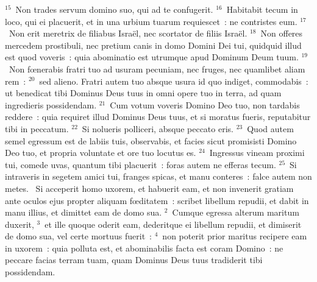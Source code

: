 ${}^{15}$~Non trades servum domino suo, qui ad te confugerit.
${}^{16}$~Habitabit tecum in loco, qui ei placuerit, et in una urbium tuarum requiescet~: ne contristes eum.
${}^{17}$~Non erit meretrix de filiabus Isra\"el, nec scortator de filiis Isra\"el.
${}^{18}$~Non offeres mercedem prostibuli, nec pretium canis in domo Domini Dei tui, quidquid illud est quod voveris~: quia abominatio est utrumque apud Dominum Deum tuum.
${}^{19}$~Non fœnerabis fratri tuo ad usuram pecuniam, nec fruges, nec quamlibet aliam rem~:
${}^{20}$~sed alieno. Fratri autem tuo absque usura id quo indiget, commodabis~: ut benedicat tibi Dominus Deus tuus in omni opere tuo in terra, ad quam ingredieris possidendam.
${}^{21}$~Cum votum voveris Domino Deo tuo, non tardabis reddere~: quia requiret illud Dominus Deus tuus, et si moratus fueris, reputabitur tibi in peccatum.
${}^{22}$~Si nolueris polliceri, absque peccato eris.
${}^{23}$~Quod autem semel egressum est de labiis tuis, observabis, et facies sicut promisisti Domino Deo tuo, et propria voluntate et ore tuo locutus es.
${}^{24}$~Ingressus vineam proximi tui, comede uvas, quantum tibi placuerit~: foras autem ne efferas tecum.
${}^{25}$~Si intraveris in segetem amici tui, franges spicas, et manu conteres~: falce autem non metes.
~Si acceperit homo uxorem, et habuerit eam, et non invenerit gratiam ante oculos ejus propter aliquam fœditatem~: scribet libellum repudii, et dabit in manu illius, et dimittet eam de domo sua.
${}^{2}$~Cumque egressa alterum maritum duxerit,
${}^{3}$~et ille quoque oderit eam, dederitque ei libellum repudii, et dimiserit de domo sua, vel certe mortuus fuerit~:
${}^{4}$~non poterit prior maritus recipere eam in uxorem~: quia polluta est, et abominabilis facta est coram Domino~: ne peccare facias terram tuam, quam Dominus Deus tuus tradiderit tibi possidendam.


